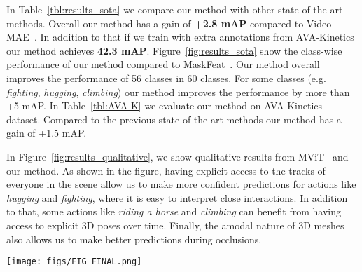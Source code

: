 In Table~\ref{tbl:results_sota} we compare our method with other state-of-the-art methods. Overall our method has a gain of \textbf{+2.8 mAP} compared to Video MAE~\cite{feichtenhofer2022masked, tong2022videomae}. In addition to that if we train with extra annotations from AVA-Kinetics our method achieves \textbf{42.3 mAP}. Figure~\ref{fig:results_sota} show the class-wise performance of our method compared to MaskFeat~\cite{wei2022masked}. Our method overall improves the performance of 56 classes in 60 classes. For some classes (e.g. \textit{fighting}, \textit{hugging}, \textit{climbing}) our method improves the performance by more than +5 mAP. In Table~\ref{tbl:AVA-K} we evaluate our method on AVA-Kinetics~\cite{li2020ava} dataset. Compared to the previous state-of-the-art methods our method has a gain of +1.5 mAP.

In Figure~\ref{fig:results_qualitative}, we show qualitative results from MViT~\cite{fan2021multiscale} and our method. As shown in the figure, having explicit access to the tracks of everyone in the scene allow us to make more confident predictions for actions like \emph{hugging} and \emph{fighting}, where it is easy to interpret close interactions. In addition to that, some actions like \emph{riding a horse} and \emph{climbing} can benefit from having access to explicit 3D poses over time. Finally, the amodal nature of 3D meshes also allows us to make better predictions during occlusions. 


\begin{figure*}[!ht]
    \centering
    \texttt{[image: figs/FIG\_FINAL.png]}
    \caption{\textbf{Comparison with State-of-the-art methods:} We show class-level performance (average precision and relative gain) of MViT~\cite{fan2021multiscale} (pretrained on MaskFeat~\cite{wei2022masked}) and ours. Our methods achieve better performance compared to MViT on over 50 classes out of 60 classes. Especially, for actions like \textit{running}, \textit{fighting}, \textit{hugging}, and \textit{sleeping} etc., our method achieves over \textbf{+5 mAP}. This shows the benefit of having access to explicit tracks and 3D poses for action recognition. We only plot the gains if it is above or below 1 mAP.}
    \label{fig:results_sota}
\end{figure*}

